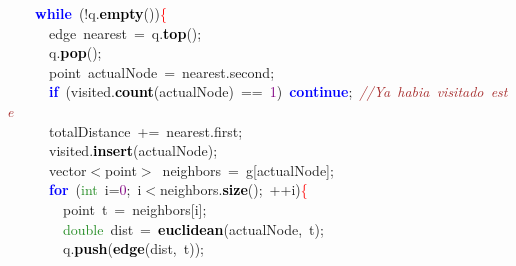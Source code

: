 \documentclass[10pt,a4paper,twoside]{article}
\begin{document}
{{{{{{\mbox{}\ \ \ \ \textbf{\textcolor{Blue}{while}}\ \textcolor{BrickRed}{(!}q\textcolor{BrickRed}{.}\textbf{\textcolor{Black}{empty}}\textcolor{BrickRed}{())}\textcolor{Red}{\{} \\
\mbox{}\ \ \ \ \ \ edge\ nearest\ \textcolor{BrickRed}{=}\ q\textcolor{BrickRed}{.}\textbf{\textcolor{Black}{top}}\textcolor{BrickRed}{();} \\
\mbox{}\ \ \ \ \ \ q\textcolor{BrickRed}{.}\textbf{\textcolor{Black}{pop}}\textcolor{BrickRed}{();} \\
\mbox{}\ \ \ \ \ \ point\ actualNode\ \textcolor{BrickRed}{=}\ nearest\textcolor{BrickRed}{.}second\textcolor{BrickRed}{;} \\
\mbox{}\ \ \ \ \ \ \textbf{\textcolor{Blue}{if}}\ \textcolor{BrickRed}{(}visited\textcolor{BrickRed}{.}\textbf{\textcolor{Black}{count}}\textcolor{BrickRed}{(}actualNode\textcolor{BrickRed}{)}\ \textcolor{BrickRed}{==}\ \textcolor{Purple}{1}\textcolor{BrickRed}{)}\ \textbf{\textcolor{Blue}{continue}}\textcolor{BrickRed}{;}\ \textit{\textcolor{Brown}{//Ya\ habia\ visitado\ este}} \\
\mbox{}\ \ \ \ \ \ totalDistance\ \textcolor{BrickRed}{+=}\ nearest\textcolor{BrickRed}{.}first\textcolor{BrickRed}{;} \\
\mbox{}\ \ \ \ \ \ visited\textcolor{BrickRed}{.}\textbf{\textcolor{Black}{insert}}\textcolor{BrickRed}{(}actualNode\textcolor{BrickRed}{);} \\
\mbox{}\ \ \ \ \ \ vector\textcolor{BrickRed}{$<$}point\textcolor{BrickRed}{$>$}\ neighbors\ \textcolor{BrickRed}{=}\ g\textcolor{BrickRed}{[}actualNode\textcolor{BrickRed}{];} \\
\mbox{}\ \ \ \ \ \ \textbf{\textcolor{Blue}{for}}\ \textcolor{BrickRed}{(}\textcolor{ForestGreen}{int}\ i\textcolor{BrickRed}{=}\textcolor{Purple}{0}\textcolor{BrickRed}{;}\ i\textcolor{BrickRed}{$<$}neighbors\textcolor{BrickRed}{.}\textbf{\textcolor{Black}{size}}\textcolor{BrickRed}{();}\ \textcolor{BrickRed}{++}i\textcolor{BrickRed}{)}\textcolor{Red}{\{} \\
\mbox{}\ \ \ \ \ \ \ \ point\ t\ \textcolor{BrickRed}{=}\ neighbors\textcolor{BrickRed}{[}i\textcolor{BrickRed}{];} \\
\mbox{}\ \ \ \ \ \ \ \ \textcolor{ForestGreen}{double}\ dist\ \textcolor{BrickRed}{=}\ \textbf{\textcolor{Black}{euclidean}}\textcolor{BrickRed}{(}actualNode\textcolor{BrickRed}{,}\ t\textcolor{BrickRed}{);} \\
\mbox{}\ \ \ \ \ \ \ \ q\textcolor{BrickRed}{.}\textbf{\textcolor{Black}{push}}\textcolor{BrickRed}{(}\textbf{\textcolor{Black}{edge}}\textcolor{BrickRed}{(}dist\textcolor{BrickRed}{,}\ t\textcolor{BrickRed}{));} \\
}}}}}}
\end{document}
